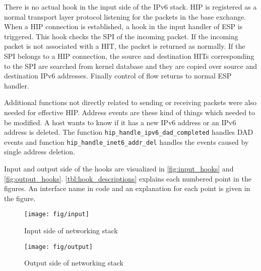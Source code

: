 There is no actual hook in the input side of the IPv6 stack. \ac{HIP}
is registered as a normal transport layer protocol listening for the
packets in the base exchange. When a \ac{HIP} connection is
established, a hook in the input handler of \ac{ESP} is
triggered. This hook checks the \ac{SPI} of the incoming packet. If
the incoming packet is not associated with a \ac{HIT}, the packet is
returned as normally. If the \ac{SPI} belongs to a \ac{HIP}
connection, the source and destination \acp{HIT} corresponding to the
\ac{SPI} are searched from kernel database and they are copied over
source and destination IPv6 addresses. Finally control of flow returns
to normal \ac{ESP} handler.

Additional functions not directly related to sending or receiving
packets were also needed for effective \ac{HIP}. Address events are
these kind of things which needed to be modified. A host wants to know
if it has a new IPv6 address or an IPv6 address is deleted. The
function \verb|hip_handle_ipv6_dad_completed| handles \ac{DAD} events
and function \verb|hip_handle_inet6_addr_del| handles the events
caused by single address deletion.

Input and output side of the hooks are visualized in
\autoref{fig:input_hooks} and \autoref{fig:output_hooks}.
\autoref{tbl:hook_descriptions} explains each numbered point in the
figures. An interface name in code and an explanation for each point
is given in the figure. 

\begin{figure}
   \begin{minipage}[b]{0.5\textwidth}
      \centering
      \texttt{[image: fig/input]}
      \caption{Input side of networking stack}
      \label{fig:input_hooks}
   \end{minipage}%
   \hfill%
   \begin{minipage}[b]{0.5\textwidth}
      \centering
      \centering
      \texttt{[image: fig/output]}
      \caption{Output side of networking stack}
      \label{fig:output_hooks}
   \end{minipage}%
\end{figure}

